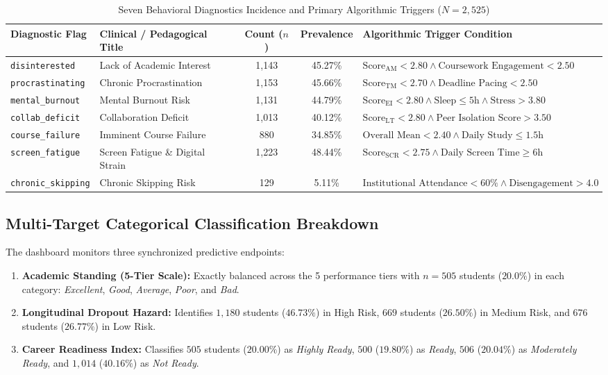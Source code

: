 \begin{table}[htbp]
\centering
\small
\caption{Seven Behavioral Diagnostics Incidence and Primary Algorithmic Triggers ($N = 2,525$)}
\label{tab:behavioral_diagnostics_prevalence}
\begin{tabular}{llccl}
\toprule
\textbf{Diagnostic Flag} & \textbf{Clinical / Pedagogical Title} & \textbf{Count ($n$)} & \textbf{Prevalence} & \textbf{Algorithmic Trigger Condition} \\
\midrule
\texttt{disinterested}   & Lack of Academic Interest             & 1,143 & 45.27\% & $\text{Score}_{\text{AM}} < 2.80 \land \text{Coursework Engagement} < 2.50$ \\
\texttt{procrastinating} & Chronic Procrastination               & 1,153 & 45.66\% & $\text{Score}_{\text{TM}} < 2.70 \land \text{Deadline Pacing} < 2.50$ \\
\texttt{mental\_burnout} & Mental Burnout Risk                   & 1,131 & 44.79\% & $\text{Score}_{\text{EI}} < 2.80 \land \text{Sleep} \le 5\text{h} \land \text{Stress} > 3.80$ \\
\texttt{collab\_deficit} & Collaboration Deficit                 & 1,013 & 40.12\% & $\text{Score}_{\text{LT}} < 2.80 \land \text{Peer Isolation Score} > 3.50$ \\
\texttt{course\_failure} & Imminent Course Failure               & 880   & 34.85\% & $\text{Overall Mean} < 2.40 \land \text{Daily Study} \le 1.5\text{h}$ \\
\texttt{screen\_fatigue} & Screen Fatigue \& Digital Strain      & 1,223 & 48.44\% & $\text{Score}_{\text{SCR}} < 2.75 \land \text{Daily Screen Time} \ge 6\text{h}$ \\
\texttt{chronic\_skipping}& Chronic Skipping Risk                & 129   & 5.11\%  & $\text{Institutional Attendance} < 60\% \land \text{Disengagement} > 4.0$ \\
\bottomrule
\end{tabular}
\end{table}

\subsection{Multi-Target Categorical Classification Breakdown}
The dashboard monitors three synchronized predictive endpoints:
\begin{enumerate}
    \item \textbf{Academic Standing (5-Tier Scale):} Exactly balanced across the 5 performance tiers with $n = 505$ students ($20.0\%$) in each category: \textit{Excellent}, \textit{Good}, \textit{Average}, \textit{Poor}, and \textit{Bad}.
    \item \textbf{Longitudinal Dropout Hazard:} Identifies $1,180$ students ($46.73\%$) in High Risk, $669$ students ($26.50\%$) in Medium Risk, and $676$ students ($26.77\%$) in Low Risk.
    \item \textbf{Career Readiness Index:} Classifies $505$ students ($20.00\%$) as \textit{Highly Ready}, $500$ ($19.80\%$) as \textit{Ready}, $506$ ($20.04\%$) as \textit{Moderately Ready}, and $1,014$ ($40.16\%$) as \textit{Not Ready}.
\end{enumerate}
